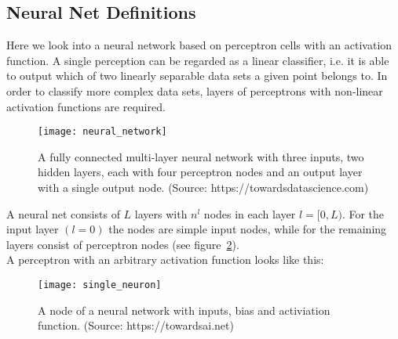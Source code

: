 \subsection{Neural Net Definitions}

Here we look into a neural network based on perceptron cells with an activation function.
A single perception can be regarded as a linear classifier, i.e. it is able to output
which of two linearly separable data sets a given point belongs to. In order to classify
more complex data sets, layers of perceptrons with non-linear activation functions are
required.

\begin{figure}[h] \centering
    \texttt{[image: neural\_network]} \caption{A fully
    connected multi-layer neural network with three inputs, two
    hidden layers, each with four perceptron nodes and an output layer with a
    single output node. (Source: https://towardsdatascience.com)} \label{fig:neural_network}
\end{figure}

A neural net consists of $L$ layers with $n^l$ nodes in each layer $l=[0,L)$. For the
input layer $(l=0)$ the nodes are simple input nodes, while for the remaining layers
consist of perceptron nodes (see figure~\ref{fig:percptron}). \\

A perceptron with an arbitrary activation function looks like this:
\begin{figure}[h] \centering \texttt{[image: single\_neuron]}
    \caption{A node of a neural network with inputs, bias and activiation function.
    (Source: https://towardsai.net)}
    \label{fig:percptron}
\end{figure}

